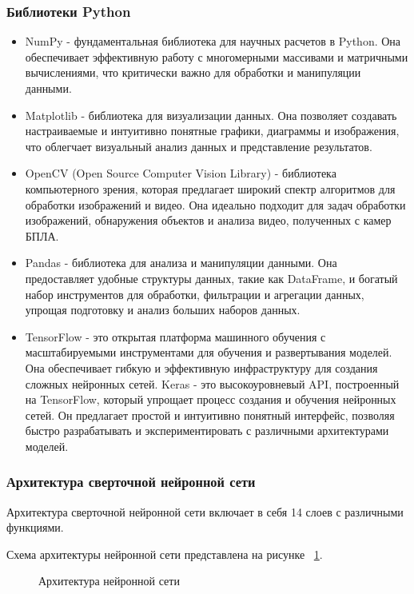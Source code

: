 \subsubsection{Библиотеки Python}

\begin{itemize}
\item NumPy - фундаментальная библиотека для научных расчетов в Python. Она обеспечивает эффективную работу с многомерными массивами и матричными вычислениями, что критически важно для обработки и манипуляции данными.
\item Matplotlib - библиотека для визуализации данных. Она позволяет создавать настраиваемые и интуитивно понятные графики, диаграммы и изображения, что облегчает визуальный анализ данных и представление результатов.
\item OpenCV (Open Source Computer Vision Library) - библиотека компьютерного зрения, которая предлагает широкий спектр алгоритмов для обработки изображений и видео. Она идеально подходит для задач обработки изображений, обнаружения объектов и анализа видео, полученных с камер БПЛА.
\item Pandas - библиотека для анализа и манипуляции данными. Она предоставляет удобные структуры данных, такие как DataFrame, и богатый набор инструментов для обработки, фильтрации и агрегации данных, упрощая подготовку и анализ больших наборов данных.
\item TensorFlow - это открытая платформа машинного обучения с масштабируемыми инструментами для обучения и развертывания моделей. Она обеспечивает гибкую и эффективную инфраструктуру для создания сложных нейронных сетей. Keras - это высокоуровневый API, построенный на TensorFlow, который упрощает процесс создания и обучения нейронных сетей. Он предлагает простой и интуитивно понятный интерфейс, позволяя быстро разрабатывать и экспериментировать с различными архитектурами моделей.
\end{itemize}

\subsubsection{Архитектура сверточной нейронной сети}

Архитектура сверточной нейронной сети включает в себя 14 слоев с различными функциями.

Схема архитектуры нейронной сети представлена на рисунке ~\ref{archNC:image}.

\begin{figure}[H]
\caption{Архитектура нейронной сети}
\label{archNC:image}
\end{figure}

